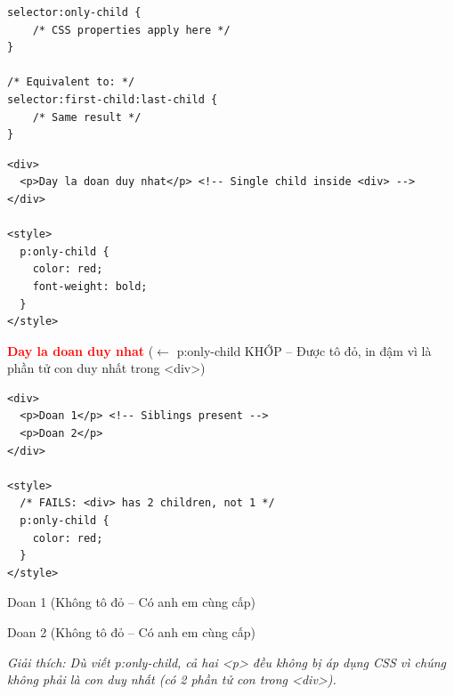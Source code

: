 \documentclass[11pt,oneside]{book}
\begin{document}
\begin{codeWindow}
\begin{lstlisting}[language=CSS3]
selector:only-child {
    /* CSS properties apply here */
}

/* Equivalent to: */
selector:first-child:last-child {
    /* Same result */
}
\end{lstlisting}
\end{codeWindow}

\begin{codeWindow}
\begin{lstlisting}[language=HTML5]
<div>
  <p>Day la doan duy nhat</p> <!-- Single child inside <div> -->
</div>

<style>
  p:only-child {
    color: red;
    font-weight: bold;
  }
</style>
\end{lstlisting}
\end{codeWindow}

\begin{browserWindow}
\sffamily\small
\textcolor{red}{\textbf{Day la doan duy nhat}} {\scriptsize\textcolor{gray!60}{($\leftarrow$ p:only-child KHỚP -- Được tô đỏ, in đậm vì là phần tử con duy nhất trong <div>)}}
\end{browserWindow}

\begin{codeWindow}
\begin{lstlisting}[language=HTML5]
<div>
  <p>Doan 1</p> <!-- Siblings present -->
  <p>Doan 2</p>
</div>

<style>
  /* FAILS: <div> has 2 children, not 1 */
  p:only-child {
    color: red;
  }
</style>
\end{lstlisting}
\end{codeWindow}

\begin{browserWindow}
\sffamily\small
Doan 1 {\scriptsize\textcolor{gray!60}{(Không tô đỏ -- Có anh em cùng cấp)}} \par\vspace{2pt}
Doan 2 {\scriptsize\textcolor{gray!60}{(Không tô đỏ -- Có anh em cùng cấp)}} \par\vspace{4pt}
{\scriptsize\textcolor{gray!60}{\textit{Giải thích: Dù viết p:only-child, cả hai <p> đều không bị áp dụng CSS vì chúng không phải là con duy nhất (có 2 phần tử con trong <div>).}}}
\end{browserWindow}
\end{document}
